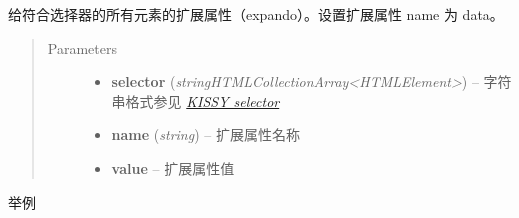 \documentclass[letterpaper,10pt,english]{sphinxmanual}
\begin{document}
\begin{fulllineitems}
给符合选择器的所有元素的扩展属性（expando）。设置扩展属性 name 为 data。
\begin{quote}\begin{description}
\item[{Parameters}] \leavevmode\begin{itemize}
\item {}
\textbf{selector} (\emph{string\textbar{}HTMLCollection\textbar{}Array\textless{}HTMLElement\textgreater{}}) -- 字符串格式参见 {\hyperref[api/core/dom/selector:dom-selector]{\emph{KISSY selector}}}

\item {}
\textbf{name} (\emph{string}) -- 扩展属性名称

\item {}
\textbf{value} -- 扩展属性值

\end{itemize}

\end{description}\end{quote}

\end{fulllineitems}


举例
\end{document}
